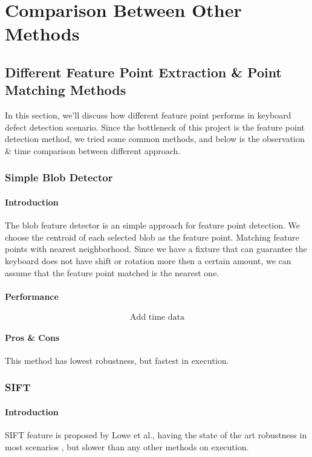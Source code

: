 \chapter{Comparison Between Other Methods}
\label{c:comparision}

\section{Different Feature Point Extraction \& Point Matching Methods}
	In this section, we'll discuss how different feature point performs in keyboard defect detection scenario.
	Since the bottleneck of this project is the feature point detection method, we tried some common methods, and below is the observation \& time comparison between different approach.

	\subsection{Simple Blob Detector}
		\subsubsection{Introduction}
			The blob feature detector is an simple approach for feature point detection. We choose the centroid of each selected blob as the feature point. Matching feature points with nearest neighborhood. 
			Since we have a fixture that can guarantee the keyboard does not have shift or rotation more then a certain amount, we can assume that the feature point matched is the nearest one.
		\subsubsection{Performance}
			$$\textrm{Add time data}$$
		\subsubsection{Pros \& Cons}
			This method has lowest robustness, but fastest in execution.

	\subsection{SIFT}
		\subsubsection{Introduction}
		SIFT feature is proposed by Lowe \cite{lowe2004distinctive} et al., having the state of the art robustness in most scenarios \cite{karami2017image}, but slower than any other methods on execution.
